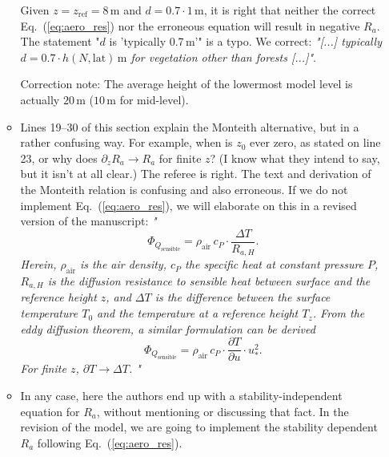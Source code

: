 \documentclass{scrartcl}
\begin{document}
\begin{itemize}
\begin{itemize}
  Given $z = z_\mathrm{ref} = 8\,\mathrm{m}$ and $d = 0.7\cdot 1\,\mathrm{m}$, it is right that neither the correct Eq.~(\ref{eq:aero_res}) nor the erroneous equation will result in negative $R_a$. The statement "$d$ is ’typically 0.7\,m’" is a typo. We correct: \emph{"[...] typically $d = 0.7\cdot h(N,\mathrm{lat})\,\mathrm{m}$ for vegetation other than forests [...]"}.

  Correction note: The average height of the lowermost model level is actually $20\,\mathrm{m}$ ($10\,\mathrm{m}$ for mid-level).
  
\item {\color{blue} Lines 19--30 of this section explain the Monteith alternative, but in a rather confusing
way. For example, when is $z_0$ ever zero, as stated on line 23, or why does $\partial_z R_a \rightarrow R_a $
for finite $z$? (I know what they intend to say, but it isn’t at all clear.)}
  The referee is right. The text and derivation of the Monteith relation is confusing and also erroneous. If we do not implement Eq.~(\ref{eq:aero_res}), we will elaborate on this in a revised version of the manuscript: \emph{"
\begin{equation}
  \Phi_{Q_\text{sensible}} = \rho_\text{air}\,c_P \cdot \frac{\Delta T}{R_{a, H}}.
  \label{eq:sens_heat}
\end{equation}
Herein, $\rho_\text{air}$ is the air density, $c_P$ the specific heat at constant pressure $P$, $R_{a, H}$ is the diffusion resistance to sensible heat between surface and the reference height $z$, and $\Delta T$ is the difference between the surface temperature $T_0$ and the temperature at a reference height $T_z$. From the eddy diffusion theorem, a similar formulation can be derived
\begin{equation}
  \Phi_{Q_\text{sensible}} = \rho_\text{air}\,c_P \cdot \frac{\partial T}{\partial u} \cdot u_*^2.
  \label{eq:eddy_theo}
\end{equation}
For finite $z$, $\partial T \rightarrow \Delta T$.
  "}

\item {\color{blue} In any case, here
the authors end up with a stability-independent equation for $R_a$, without mentioning or
discussing that fact.}
  In the revision of the model, we are going to implement the stability dependent $R_a$ following Eq.~(\ref{eq:aero_res}).
  

\end{itemize}
\end{itemize}
\end{document}
